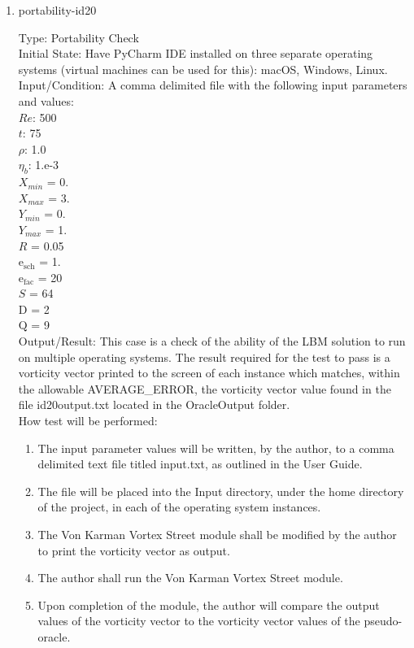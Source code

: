 \documentclass[12pt, titlepage]{article}
\begin{document}
\begin{enumerate}

\item{portability-id20\\}

Type: Portability Check\\
					
Initial State: Have PyCharm IDE installed on three separate operating systems (virtual machines can be used for this): macOS, Windows, Linux. \\
					
Input/Condition: A comma delimited file with the following input parameters and values:\\
$Re$: 500\\
$t$: 75\\
$\rho$: 1.0\\
$\eta_b$: 1.e-3\\
$X_{min}$ = 0.\\
$X_{max}$ = 3.\\
$Y_{min}$ = 0.\\
$Y_{max}$ = 1.\\
$R$ = 0.05\\
$\mathrm{e_{sch}}$ = 1.\\
$\mathrm{e_{fac}}$ = 20\\
$S$ = 64\\
$\mathrm{D}$ = 2\\
$\mathrm{Q}$ = 9\\

					
Output/Result: This case is a check of the ability of the LBM solution to run on multiple operating systems. The result required for the test to pass is a vorticity vector printed to the screen of each instance which matches, within the allowable AVERAGE\_ERROR, the vorticity vector value found in the file id20output.txt located in the OracleOutput folder.\\
					
How test will be performed: 

\begin{enumerate}

\item The input parameter values will be written, by the author, to a comma delimited text file titled input.txt, as outlined in the User Guide.
\item The file will be placed into the Input directory, under the home directory of the project, in each of the operating system instances.
\item The Von Karman Vortex Street module shall be modified by the author to print the vorticity vector as output.
\item The author shall run the Von Karman Vortex Street module.
\item Upon completion of the module, the author will compare the output values of the vorticity vector to the vorticity vector values of the pseudo-oracle.\\
\end{enumerate}

\end{enumerate}
\end{document}
